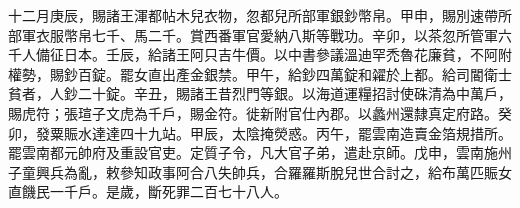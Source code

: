 \begin{pinyinscope}
 十二月庚辰，賜諸王渾都帖木兒衣物，忽都兒所部軍銀鈔幣帛。甲申，賜別速帶所部軍衣服幣帛七千、馬二千。賞西番軍官愛納八斯等戰功。辛卯，以茶忽所管軍六千人備征日本。壬辰，給諸王阿只吉牛價。以中書參議溫迪罕禿魯花廉貧，不阿附權勢，賜鈔百錠。罷女直出產金銀禁。甲午，給鈔四萬錠和糴於上都。給司閽衛士貧者，人鈔二十錠。辛丑，賜諸王昔烈門等銀。以海道運糧招討使硃清為中萬戶，賜虎符；張瑄子文虎為千戶，賜金符。徙新附官仕內郡。以蠡州還隸真定府路。癸卯，發粟賑水達達四十九站。甲辰，太陰掩熒惑。丙午，罷雲南造賣金箔規措所。罷雲南都元帥府及重設官吏。定質子令，凡大官子弟，遣赴京師。戊申，雲南施州子童興兵為亂，敕參知政事阿合八失帥兵，合羅羅斯脫兒世合討之，給布萬匹賑女直饑民一千戶。是歲，斷死罪二百七十八人。



\end{pinyinscope}